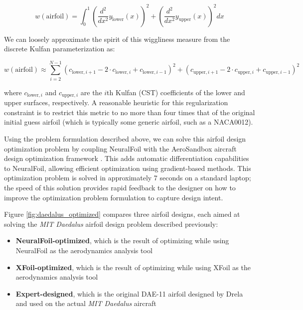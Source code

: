 \documentclass[conf]{new-aiaa}
\begin{document}
    $$w(\mathrm{airfoil}) = \int_0^1 \left( \frac{d^2}{dx^2} y_\mathrm{lower}(x) \right)^2 + \left( \frac{d^2}{dx^2} y_\mathrm{upper}(x) \right)^2 dx$$

    \noindent We can loosely approximate the spirit of this wiggliness measure from the discrete Kulfan parameterization as:

    $$w(\mathrm{airfoil}) \approx \sum_{i=2}^{N-1} \left(c_{\mathrm{lower},i+1} - 2 \cdot c_{\mathrm{lower},i} + c_{\mathrm{lower},i-1} \right)^2 + \left(c_{\mathrm{upper},i+1} - 2 \cdot c_{\mathrm{upper},i} + c_{\mathrm{upper},i-1} \right)^2$$

    \noindent where $c_{\mathrm{lower},i}$ and $c_{\mathrm{upper},i}$ are the $i$th Kulfan (CST) coefficients of the lower and upper surfaces, respectively. A reasonable heuristic for this regularization constraint is to restrict this metric to no more than four times that of the original initial guess airfoil (which is typically some generic airfoil, such as a NACA0012).

    Using the problem formulation described above, we can solve this airfoil design optimization problem by coupling NeuralFoil with the AeroSandbox aircraft design optimization framework \cite{sharpe_aerosandbox_2021}. This adds automatic differentiation capabilities to NeuralFoil, allowing efficient optimization using gradient-based methods. This optimization problem is solved in approximately 7 seconds on a standard laptop; the speed of this solution provides rapid feedback to the designer on how to improve the optimization problem formulation to capture design intent.

    Figure \ref{fig:daedalus_optimized} compares three airfoil designs, each aimed at solving the \emph{MIT Daedalus} airfoil design problem described previously:

    \begin{itemize}
        \item \textbf{NeuralFoil-optimized}, which is the result of optimizing while using NeuralFoil as the aerodynamics analysis tool
        \item \textbf{XFoil-optimized}, which is the result of optimizing while using XFoil as the aerodynamics analysis tool
        \item \textbf{Expert-designed}, which is the original DAE-11 airfoil designed by Drela \cite{drela_lowreynoldsnumber_1988} and used on the actual \emph{MIT Daedalus} aircraft
    \end{itemize}
\end{document}
